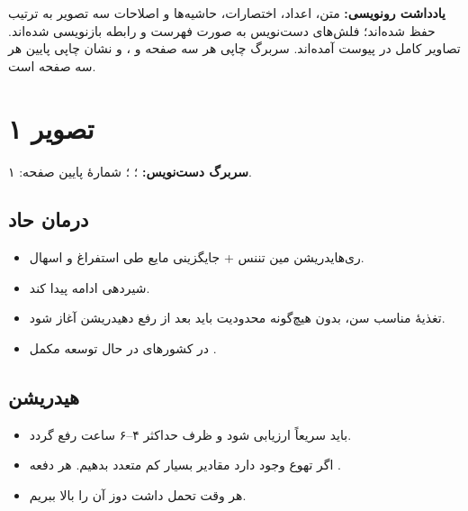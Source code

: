 \documentclass[12pt,a4paper]{article}
\begin{document}
\fi
\providecommand{\AGEPage}[1]{\clearpage\section*{تصویر #1}}
\providecommand{\AGEMath}[1]{\mbox{\lr{\(#1\)}}}
\providecommand{\AGEArrow}{\lr{\(\longleftarrow\)}}
\providecommand{\AGEImagePath}{images/}
\IfFileExists{images/pic01.jpg}{}{%
  \renewcommand{\AGEImagePath}{pediatrics/ped-gastroenterology/AGE/images/}}

\begin{center}
{\Large\bfseries {}}\par
{}
\end{center}
\textbf{یادداشت رونویسی:} متن، اعداد، اختصارات، حاشیه‌ها و اصلاحات سه تصویر به ترتیب حفظ شده‌اند؛ فلش‌های دست‌نویس به صورت فهرست و رابطه بازنویسی شده‌اند. تصاویر کامل در پیوست آمده‌اند. سربرگ چاپی هر سه صفحه  و ، و نشان چاپی پایین هر سه صفحه  است.

\section*{تصویر ۱}
\textbf{سربرگ دست‌نویس:} ؛ ؛ شمارهٔ پایین صفحه: ۱.

\subsection*{درمان  حاد}
\begin{itemize}
\item ری‌هایدریشن \AGEArrow{}  مین تننس + جایگزینی مایع  طی استفراغ و اسهال.
\item شیردهی ادامه پیدا کند.
\item تغذیهٔ مناسب سن، بدون هیچ‌گونه محدودیت باید  بعد از رفع دهیدریشن آغاز شود.
\item در کشورهای در حال توسعه مکمل .
\end{itemize}

\subsection*{هیدریشن}
\begin{itemize}
\item باید سریعاً ارزیابی شود و ظرف حداکثر ۴–۶ ساعت رفع گردد.
\item اگر تهوع وجود دارد مقادیر بسیار کم متعدد بدهیم. هر دفعه .
\item هر وقت تحمل داشت دوز آن را بالا ببریم.
\end{itemize}
\end{document}

